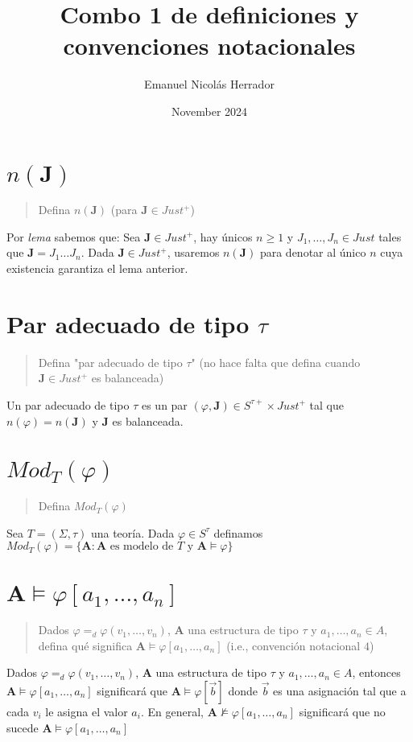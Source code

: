 \documentclass{article}
\title{Combo 1 de definiciones y convenciones notacionales}
\author{Emanuel Nicolás Herrador}
\date{November 2024}
\begin{document}
\maketitle

\section{$n(\mathbf{J})$}
\begin{quote}
    Defina $n(\mathbf{J})$ (para $\mathbf{J}\in Just^+$)
\end{quote}
Por \textit{lema} sabemos que: Sea $\mathbf{J}\in Just^+$, hay únicos $n\geq 1$ y $J_1,\dots,J_n\in Just$ tales que $\mathbf{J}=J_1\dots J_n$.
\newline
Dada $\mathbf{J}\in Just^+$, usaremos $n(\mathbf{J})$ para denotar al único $n$ cuya existencia garantiza el lema anterior.

\section{Par adecuado de tipo $\tau$}
\begin{quote}
    Defina "par adecuado de tipo $\tau$" (no hace falta que defina cuando $\mathbf{J}\in Just^+$ es balanceada)
\end{quote}
Un par adecuado de tipo $\tau$ es un par $(\varphi,\mathbf{J})\in S^{\tau+}\times Just^+$ tal que $n(\varphi)=n(\mathbf{J})$ y $\mathbf{J}$ es balanceada.

\section{$Mod_T(\varphi)$}
\begin{quote}
    Defina $Mod_T(\varphi)$
\end{quote}
Sea $T=(\Sigma,\tau)$ una teoría. Dada $\varphi\in S^\tau$ definamos $Mod_T(\varphi)=\{\mathbf{A}:\mathbf{A}\text{ es modelo de }T\text{ y }\mathbf{A}\vDash\varphi\}$

\section{$\mathbf{A}\vDash\varphi[a_1,\dots,a_n]$}
\begin{quote}
    Dados $\varphi=_d\varphi(v_1,\dots,v_n)$, $\mathbf{A}$ una estructura de tipo $\tau$ y $a_1,\dots,a_n\in A$, defina qué significa $\mathbf{A}\vDash\varphi[a_1,\dots,a_n]$ (i.e., convención notacional $4$)
\end{quote}
Dados $\varphi=_d\varphi(v_1,\dots,v_n)$, $\mathbf{A}$ una estructura de tipo $\tau$ y $a_1,\dots,a_n\in A$, entonces $\mathbf{A}\vDash\varphi[a_1,\dots,a_n]$ significará que $\mathbf{A}\vDash\varphi[\vec{b}]$ donde $\vec{b}$ es una asignación tal que a cada $v_i$ le asigna el valor $a_i$.
\newline
En general, $\mathbf{A}\nvDash\varphi[a_1,\dots,a_n]$ significará que no sucede $\mathbf{A}\vDash\varphi[a_1,\dots,a_n]$
\end{document}
